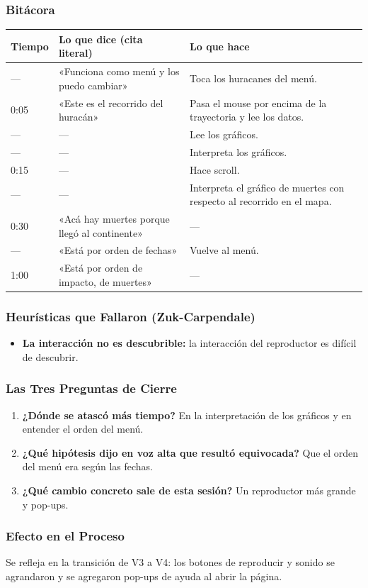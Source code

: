 \documentclass[11pt,a4paper]{article}
\begin{document}
	\subsubsection{Bitácora}
	\begin{center}
		\small
		\begin{tabularx}{\textwidth}{lp{6.8cm}X}
			\toprule
			\textbf{Tiempo} & \textbf{Lo que dice (cita literal)} & \textbf{Lo que hace} \\
			\midrule
			--- & «Funciona como menú y los puedo cambiar» & Toca los huracanes del menú. \\
			0:05 & «Este es el recorrido del huracán» & Pasa el mouse por encima de la trayectoria y lee los datos. \\
			--- & --- & Lee los gráficos. \\
			--- & --- & Interpreta los gráficos. \\
			0:15 & --- & Hace scroll. \\
			--- & --- & Interpreta el gráfico de muertes con respecto al recorrido en el mapa. \\
			0:30 & «Acá hay muertes porque llegó al continente» & --- \\
			--- & «Está por orden de fechas» & Vuelve al menú. \\
			1:00 & «Está por orden de impacto, de muertes» & --- \\
			\bottomrule
		\end{tabularx}
	\end{center}

	\subsubsection{Heurísticas que Fallaron (Zuk-Carpendale)}
	\begin{itemize}
		\item \textbf{La interacción no es descubrible:} la interacción del reproductor es difícil de descubrir.
	\end{itemize}

	\subsubsection{Las Tres Preguntas de Cierre}
	\begin{enumerate}
		\item \textbf{¿Dónde se atascó más tiempo?} En la interpretación de los gráficos y en entender el orden del menú.
		\item \textbf{¿Qué hipótesis dijo en voz alta que resultó equivocada?} Que el orden del menú era según las fechas.
		\item \textbf{¿Qué cambio concreto sale de esta sesión?} Un reproductor más grande y pop-ups.
	\end{enumerate}

	\subsubsection{Efecto en el Proceso}
	Se refleja en la transición de V3 a V4: los botones de reproducir y sonido se agrandaron y se agregaron pop-ups de ayuda al abrir la página.
\end{document}
